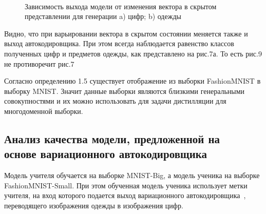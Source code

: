 \begin{figure}[h!t]\center
{}
\qquad
{}\\
\caption{Зависимость выхода модели от изменения вектора в скрытом представлении для генерации a) цифр; b) одежды}
\end{figure}

Видно, что при варьировании вектора в скрытом состоянии меняется также и выход автокодировщика. При этом всегда наблюдается равенство классов полученных цифр и предметов одежды, как представлено на рис.7а. То есть рис.9 не противоречит рис.7

Согласно определению 1.5 существует отображение из выборки FashionMNIST в выборку MNIST. Значит данные выборки являются близкими генеральными совокупностями и их можно использовать для задачи дистилляции для многодоменной выборки.

\subsection{Анализ качества модели, предложенной на\\
основе вариационного автокодировщика}

Модель учителя обучается на выборке MNIST-Big, а модель ученика на выборке FashionMNIST-Small. При этом обученная модель ученика использует метки учителя, на вход которого подается выход вариационного автокодировщика~\cite{VAE}, переводящего изображения одежды в изображения цифр.

